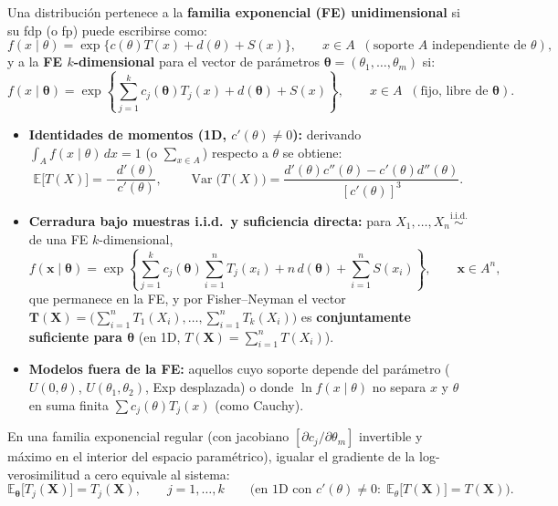 \documentclass[10pt,a4paper]{article}
\newcommand{\E}{\mathbb{E}}
\newcommand{\Var}{\operatorname{Var}}
\newcommand{\iid}{\overset{\text{i.i.d.}}{\sim}}
\begin{document}
\begin{defbox}[frametitle={Familia Exponencial (FE) 1D y $k$-dimensional}]
Una distribución pertenece a la \textbf{familia exponencial (FE) unidimensional} si su fdp (o fp) puede escribirse como:
\[
f(x \mid \theta) = \exp\big\{c(\theta)T(x) + d(\theta) + S(x)\big\}, \qquad x \in A \;\;(\text{soporte } A \text{ independiente de }\theta),
\]
y a la \textbf{FE $k$-dimensional} para el vector de parámetros $\boldsymbol{\theta} = (\theta_1, \dots, \theta_m)$ si:
\[
f(x \mid \boldsymbol{\theta}) = \exp\left\{\sum_{j=1}^k c_j(\boldsymbol{\theta})T_j(x) + d(\boldsymbol{\theta}) + S(x)\right\}, \qquad x \in A \;\;(\text{fijo, libre de }\boldsymbol{\theta}).
\]
\begin{itemize}
  \item \textbf{Identidades de momentos (1D, $c'(\theta) \ne 0$):} derivando $\int_A f(x \mid \theta)\,dx = 1$ (o $\sum_{x \in A}$) respecto a $\theta$ se obtiene:
  \[
  \E\big[T(X)\big] = -\frac{d'(\theta)}{c'(\theta)}, \qquad \Var\big(T(X)\big) = \frac{d'(\theta)c''(\theta) - c'(\theta)d''(\theta)}{[c'(\theta)]^3}.
  \]
  \item \textbf{Cerradura bajo muestras i.i.d.\ y suficiencia directa:} para $X_1, \dots, X_n \iid$ de una FE $k$-dimensional,
  \[
  f(\mathbf{x} \mid \boldsymbol{\theta}) = \exp\left\{\sum_{j=1}^k c_j(\boldsymbol{\theta})\sum_{i=1}^n T_j(x_i) + n\,d(\boldsymbol{\theta}) + \sum_{i=1}^n S(x_i)\right\}, \qquad \mathbf{x} \in A^n,
  \]
  que permanece en la FE, y por Fisher--Neyman el vector $\mathbf{T}(\mathbf{X}) = \big(\sum_{i=1}^n T_1(X_i), \dots, \sum_{i=1}^n T_k(X_i)\big)$ es \textbf{conjuntamente suficiente para $\boldsymbol{\theta}$} (en 1D, $T(\mathbf{X}) = \sum_{i=1}^n T(X_i)$).
  \item \textbf{Modelos fuera de la FE:} aquellos cuyo soporte depende del parámetro ($U(0,\theta)$, $U(\theta_1,\theta_2)$, Exp desplazada) o donde $\ln f(x\mid\theta)$ no separa $x$ y $\theta$ en suma finita $\sum c_j(\theta)T_j(x)$ (como Cauchy).
\end{itemize}
\end{defbox}

\begin{thmbox}[frametitle={Ecuación general del EMV en la Familia Exponencial}]
En una familia exponencial regular (con jacobiano $[\partial c_j / \partial \theta_m]$ invertible y máximo en el interior del espacio paramétrico), igualar el gradiente de la log-verosimilitud a cero equivale al sistema:
\[
\E_{\boldsymbol{\theta}}\big[T_j(\mathbf{X})\big] = T_j(\mathbf{X}), \qquad j = 1, \dots, k \qquad\Big(\text{en 1D con } c'(\theta) \ne 0:\; \E_\theta\big[T(\mathbf{X})\big] = T(\mathbf{X})\Big).
\]
\end{thmbox}
\end{document}
